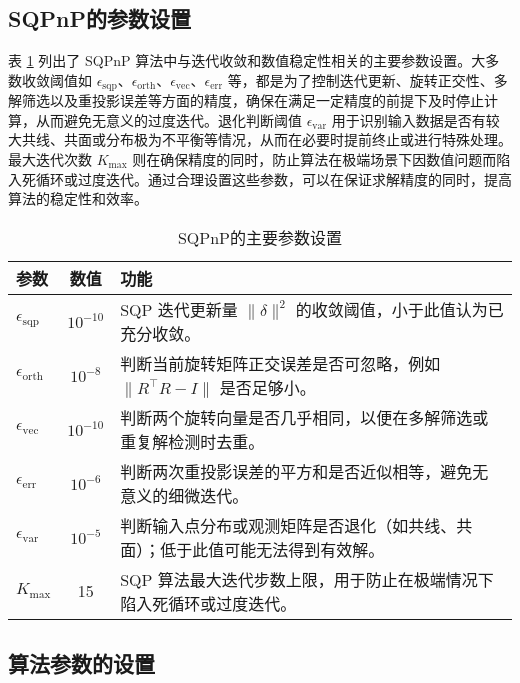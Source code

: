 \subsection{SQPnP的参数设置}
表 \ref{tab:sqpnp-params} 列出了 SQPnP 算法中与迭代收敛和数值稳定性相关的主要参数设置。大多数收敛阈值如 \(\epsilon_{\mathrm{sqp}}\)、\(\epsilon_{\mathrm{orth}}\)、\(\epsilon_{\mathrm{vec}}\)、\(\epsilon_{\mathrm{err}}\) 等，都是为了控制迭代更新、旋转正交性、多解筛选以及重投影误差等方面的精度，确保在满足一定精度的前提下及时停止计算，从而避免无意义的过度迭代。退化判断阈值 \(\epsilon_{\mathrm{var}}\) 用于识别输入数据是否有较大共线、共面或分布极为不平衡等情况，从而在必要时提前终止或进行特殊处理。最大迭代次数 \(K_{\mathrm{max}}\) 则在确保精度的同时，防止算法在极端场景下因数值问题而陷入死循环或过度迭代。通过合理设置这些参数，可以在保证求解精度的同时，提高算法的稳定性和效率。
\begin{table}[htbp]
	\centering
	\caption{SQPnP的主要参数设置}
	\label{tab:sqpnp-params}
	\begin{tabular}{l c p{7.5cm}}
		\toprule
		\textbf{参数} & \textbf{数值} & \textbf{功能} \\
		\midrule
		
		$\epsilon_{\mathrm{sqp}}$      & $10^{-10}$ & 
		SQP 迭代更新量 $\|\delta\|^2$ 的收敛阈值，小于此值认为已充分收敛。\\[3pt]
		
		$\epsilon_{\mathrm{orth}}$     & $10^{-8}$  & 
		判断当前旋转矩阵正交误差是否可忽略，例如 $\|R^\top R - I\|$ 是否足够小。\\[3pt]
		
		$\epsilon_{\mathrm{vec}}$      & $10^{-10}$ &
		判断两个旋转向量是否几乎相同，以便在多解筛选或重复解检测时去重。\\[3pt]
		
		$\epsilon_{\mathrm{err}}$      & $10^{-6}$  &
		判断两次重投影误差的平方和是否近似相等，避免无意义的细微迭代。\\[3pt]
		
		$\epsilon_{\mathrm{var}}$      & $10^{-5}$  &
		判断输入点分布或观测矩阵是否退化（如共线、共面）；低于此值可能无法得到有效解。\\[3pt]
		
		$K_{\mathrm{max}}$             & 15         &
		SQP 算法最大迭代步数上限，用于防止在极端情况下陷入死循环或过度迭代。\\
		\bottomrule
	\end{tabular}
\end{table}


\subsection{算法参数的设置}

